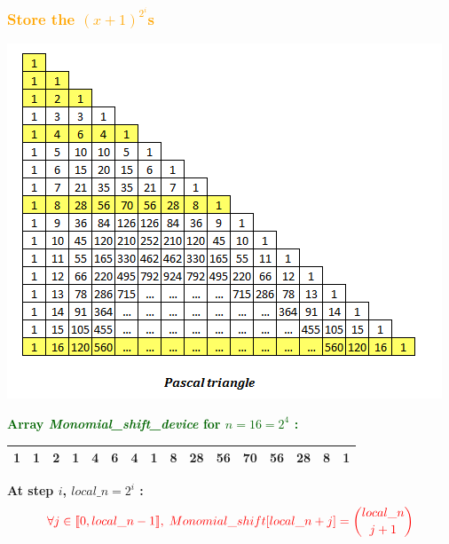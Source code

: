 

\begin{frame}[fragile]
\frametitle{\textbf{\textcolor{orange}{Store the $(x+1)^{2^i}$s}}}

\begin{center}
\includegraphics[scale = 0.364]{PascalTriangle.png}
\end{center}

\textcolor{darkgreen}{\textbf{Array \textit{Monomial\_shift\_device} for $n = 16 = 2^4$ :}}
\begin{center}
\tiny{
\begin{tabular}{|c||c||c|c||c|c|c|c||c|c|c|c|c|c|c|c|} \hline
1 & 1 & 2 & 1 & 4 & 6 & 4 & 1 & 8 & 28 & 56 & 70 & 56 & 28 & 8 & 1 \\ \hline
\end{tabular}
}
\end{center}

\textbf{At step $i$, $local\_n = 2^i$ :}
$$\textcolor{red}{\forall j\in \mbox{\textlbrackdbl} 0, local\_n - 1\mbox{\textrbrackdbl},\; Monomial\_shift[local\_n + j] = {local\_n \choose j + 1}}$$

\end{frame}


